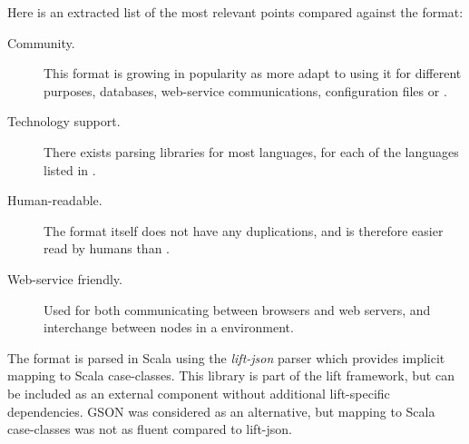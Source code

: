 Here is an extracted list of the most relevant points compared against the  format:
\begin{description}
  \item[Community.] This format is growing in popularity as more adapt to using it for
    different purposes, \eg databases, web-service communications, configuration files or .
  \item[Technology support.]
    There exists parsing libraries for most languages,
    for each of the languages listed in .
  \item[Human-readable.]
    The format itself does not have any duplications, and is therefore easier read by humans
    than .
  \item[Web-service friendly.]
    Used for both communicating between browsers and web servers, 
    and interchange between nodes in a  environment.
\end{description}

The  format is parsed in Scala using the \emph{lift-json} parser which provides implicit
mapping to Scala case-classes. This library is part of the lift framework,
but can be included as an external component without additional lift-specific dependencies.
GSON was considered as an alternative, but mapping to Scala case-classes was not as 
fluent compared to lift-json.

